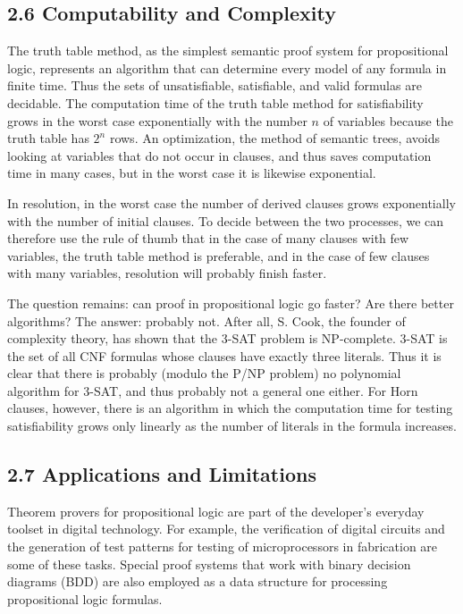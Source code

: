 \documentclass[10pt]{article}
\begin{document}
\subsection*{2.6 Computability and Complexity}
The truth table method, as the simplest semantic proof system for propositional logic, represents an algorithm that can determine every model of any formula in finite time. Thus the sets of unsatisfiable, satisfiable, and valid formulas are decidable. The computation time of the truth table method for satisfiability grows in the worst case exponentially with the number $n$ of variables because the truth table has $2^{n}$ rows. An optimization, the method of semantic trees, avoids looking at variables that do not occur in clauses, and thus saves computation time in many cases, but in the worst case it is likewise exponential.

In resolution, in the worst case the number of derived clauses grows exponentially with the number of initial clauses. To decide between the two processes, we can therefore use the rule of thumb that in the case of many clauses
 with few variables, the truth table method is preferable, and in the case of few clauses with many variables, resolution will probably finish faster.

The question remains: can proof in propositional logic go faster? Are there better algorithms? The answer: probably not. After all, S. Cook, the founder of complexity theory, has shown that the 3-SAT problem is NP-complete. 3-SAT is the set of all CNF formulas whose clauses have exactly three literals. Thus it is clear that there is probably (modulo the P/NP problem) no polynomial algorithm for 3-SAT, and thus probably not a general one either. For Horn clauses, however, there is an algorithm in which the computation time for testing satisfiability grows only linearly as the number of literals in the formula increases.

\subsection*{2.7 Applications and Limitations}
Theorem provers for propositional logic are part of the developer's everyday toolset in digital technology. For example, the verification of digital circuits and the generation of test patterns for testing of microprocessors in fabrication are some of these tasks. Special proof systems that work with binary decision diagrams (BDD) are also employed as a data structure for processing propositional logic formulas.
\end{document}
